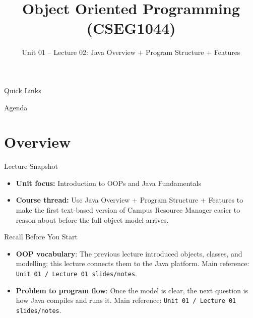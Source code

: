 \documentclass{beamer}
\title[OOPS with Java]{Object Oriented Programming (CSEG1044)}
\subtitle{Unit 01 -- Lecture 02: Java Overview + Program Structure + Features}
\begin{document}
\begin{frame}[fragile]
  \titlepage
  \vspace{0.5em}
  \slidesources{\OOPSUnitISources}
\end{frame}

\begin{frame}{Quick Links}
  \centering
  \hyperlink{sec:overview}{}\hspace{0.6em}
  \hyperlink{sec:concepts}{}\hspace{0.6em}
  \hyperlink{sec:demo}{}\hspace{0.6em}
  \hyperlink{sec:summary}{}
  \slidesources{\OOPSUnitISources}
\end{frame}

\begin{frame}{Agenda}
  \tableofcontents
  \slidesources{\OOPSUnitISources}
\end{frame}

\section{Overview}
\label{sec:overview}

\begin{frame}{Lecture Snapshot}
\begin{itemize}[<+->]
  \item \textbf{Unit focus:} Introduction to OOPs and Java Fundamentals
  \item \textbf{Course thread:} Use Java Overview + Program Structure + Features to make the first text-based version of Campus Resource Manager easier to reason about before the full object model arrives.
\end{itemize}
  \slidesources{\OOPSUnitISources}
\end{frame}

\begin{frame}{Recall Before You Start}
\begin{itemize}[<+->]
  \item \textbf{OOP vocabulary}: The previous lecture introduced objects, classes, and modelling; this lecture connects them to the Java platform. Main reference: \texttt{Unit 01 / Lecture 01 slides/notes}.
  \item \textbf{Problem to program flow}: Once the model is clear, the next question is how Java compiles and runs it. Main reference: \texttt{Unit 01 / Lecture 01 slides/notes}.
\end{itemize}
  \slidesources{\OOPSUnitISources}
\end{frame}
\end{document}
